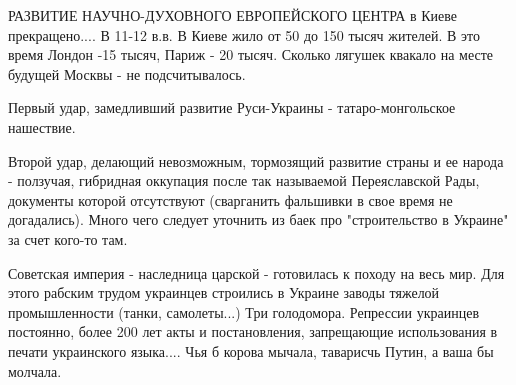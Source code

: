 \begin{itemize}
РАЗВИТИЕ НАУЧНО-ДУХОВНОГО ЕВРОПЕЙСКОГО ЦЕНТРА в Киеве прекращено.... В 11-12
в.в. В Киеве жило от 50 до 150 тысяч жителей. В это время Лондон -15 тысяч,
Париж - 20 тысяч. Сколько лягушек квакало на месте будущей Москвы - не
подсчитывалось.

Первый удар, замедливший развитие Руси-Украины - татаро-монгольское нашествие.

Второй удар, делающий невозможным, тормозящий развитие страны и ее народа -
ползучая, гибридная оккупация после так называемой Переяславской Рады,
документы которой отсутствуют (сварганить фальшивки в свое время не
догадались). Много чего следует уточнить из баек про "строительство в Украине"
за счет кого-то там. 

Советская империя - наследница царской - готовилась к походу на весь мир. Для
этого рабским трудом украинцев строились в Украине заводы тяжелой
промышленности (танки, самолеты...) Три голодомора. Репрессии украинцев
постоянно, более 200 лет акты и постановления, запрещающие использования в
печати украинского языка.... Чья б корова мычала, таварисчь Путин, а ваша бы
молчала.

\end{itemize}


